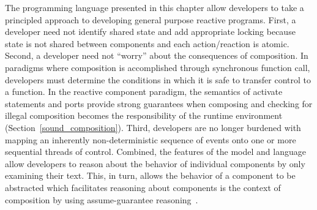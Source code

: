 The programming language presented in this chapter allow developers to take a principled approach to developing general purpose reactive programs.
First, a developer need not identify shared state and add appropriate locking because state is not shared between components and each action/reaction is atomic.
Second, a developer need not ``worry'' about the consequences of composition.
In paradigms where composition is accomplished through synchronous function call, developers must determine the conditions in which it is safe to transfer control to a function.
In the reactive component paradigm, the semantics of activate statements and ports provide strong guarantees when composing and checking for illegal composition becomes the responsibility of the runtime environment (Section~\ref{sound_composition}).
Third, developers are no longer burdened with mapping an inherently non-deterministic sequence of events onto one or more sequential threads of control.
Combined, the features of the model and language allow developers to reason about the behavior of individual components by only examining their text.
This, in turn, allows the behavior of a component to be abstracted which facilitates reasoning about components is the context of composition by using assume-guarantee reasoning~\cite{Jones:1983:TST:69575.69577}.
